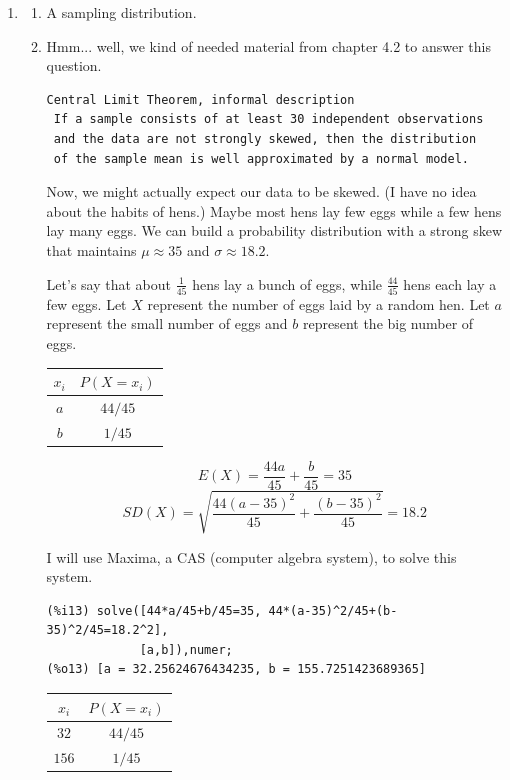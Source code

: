 \documentclass[12pt,letterpaper]{article}
\begin{document}
\begin{enumerate}
\item \begin{enumerate}
\item A sampling distribution. 
\item Hmm... well, we kind of needed material from chapter 4.2 to answer this question. 
\begin{verbatim}
Central Limit Theorem, informal description
 If a sample consists of at least 30 independent observations 
 and the data are not strongly skewed, then the distribution
 of the sample mean is well approximated by a normal model.
\end{verbatim}
Now, we might actually expect our data to be skewed. (I have no idea about the habits of hens.) Maybe most hens lay few eggs while a few hens lay many eggs. We can build a probability distribution with a strong skew that maintains $\mu\approx 35$ and $\sigma \approx 18.2$.

Let's say that about $\frac{1}{45}$ hens lay a bunch of eggs, while $\frac{44}{45}$ hens each lay a few eggs. Let $X$ represent the number of eggs laid by a random hen. Let $a$ represent the small number of eggs and $b$ represent the big number of eggs.

\begin{center}
\begin{tabular}{|c|c|}\hline
$x_i$ & $P(X=x_i)$ \\ \hline
$a$   &  $44/45$\\
$b$   &  $1/45$ \\\hline
\end{tabular}
\end{center}

$$E(X) = \frac{44a}{45} + \frac{b}{45} = 35$$
$$SD(X) = \sqrt{\frac{44(a-35)^2}{45}+\frac{(b-35)^2}{45}} = 18.2$$

I will use Maxima, a CAS (computer algebra system), to solve this system.
\begin{verbatim}
(%i13) solve([44*a/45+b/45=35, 44*(a-35)^2/45+(b-35)^2/45=18.2^2],
             [a,b]),numer;
(%o13) [a = 32.25624676434235, b = 155.7251423689365]
\end{verbatim}

\begin{center}
\begin{tabular}{|c|c|}\hline
$x_i$ & $P(X=x_i)$ \\ \hline
$32$   &  $44/45$\\
$156$   &  $1/45$ \\\hline
\end{tabular}
\end{center}


\end{enumerate}
\end{enumerate}
\end{document}
